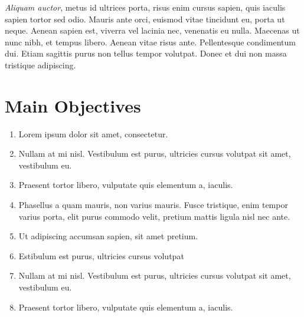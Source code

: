 \documentclass[a1,portrait]{a1poster}
\begin{document}
\begin{multicols}{2}
\textit{Aliquam auctor}, metus id ultrices porta, risus enim cursus sapien, quis iaculis sapien tortor sed odio. Mauris ante orci, euismod vitae tincidunt eu, porta ut neque. Aenean sapien est, viverra vel lacinia nec, venenatis eu nulla. Maecenas ut nunc nibh, et tempus libero. Aenean vitae risus ante. Pellentesque condimentum dui. Etiam sagittis purus non tellus tempor volutpat. Donec et dui non massa tristique adipiscing.


\color{Black} %

\section*{Main Objectives}

\begin{enumerate}
\item Lorem ipsum dolor sit amet, consectetur.
\item Nullam at mi nisl. Vestibulum est purus, ultricies cursus volutpat sit amet, vestibulum eu.
\item Praesent tortor libero, vulputate quis elementum a, iaculis.
\item Phasellus a quam mauris, non varius mauris. Fusce tristique, enim tempor varius porta, elit purus commodo velit, pretium mattis ligula nisl nec ante.
\item Ut adipiscing accumsan sapien, sit amet pretium.
\item Estibulum est purus, ultricies cursus volutpat
\item Nullam at mi nisl. Vestibulum est purus, ultricies cursus volutpat sit amet, vestibulum eu.
\item Praesent tortor libero, vulputate quis elementum a, iaculis.
\end{enumerate}




\end{multicols}
\end{document}
